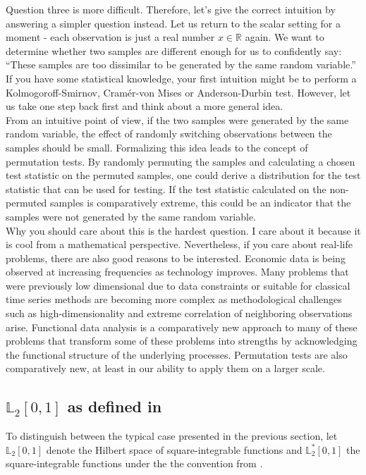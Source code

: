\documentclass[12pt, a4paper]{article}
\theoremstyle{MAstyle} \newtheorem{assumption}{Assumption}[section]
\theoremstyle{MAstyle} \newtheorem{definition}{Definition}[section]
\theoremstyle{MAstyle} \newtheorem{theorem}{Theorem}[section]
\begin{document}
			Question three is more difficult. Therefore, let's give the correct intuition by answering a simpler question instead. Let us return to the scalar setting for a moment - each observation is just a real number $x \in \mathbb{R}$ again. We want to determine whether two samples are different enough for us to confidently say: ``These samples are too dissimilar to be generated by the same random variable.'' If you have some statistical knowledge, your first intuition might be to perform a Kolmogoroff-Smirnov, Cram\'{e}r-von Mises or Anderson-Durbin test. However, let us take one step back first and think about a more general idea.\\
			
			From an intuitive point of view, if the two samples were generated by the same random variable, the effect of randomly switching observations between the samples should be small. Formalizing this idea leads to the concept of permutation tests. By randomly permuting the samples and calculating a chosen test statistic on the permuted samples, one could derive a distribution for the test statistic that can be used for testing. If the test statistic calculated on the non-permuted samples is comparatively extreme, this could be an indicator that the samples were not generated by the same random variable.\\
			
			Why you should care about this is the hardest question. I care about it because it is cool from a mathematical perspective. Nevertheless, if you care about real-life problems, there are also good reasons to be interested. Economic data is being observed at increasing frequencies as technology improves. Many problems that were previously low dimensional due to data constraints or suitable for classical time series methods are becoming more complex as methodological challenges such as high-dimensionality and extreme correlation of neighboring observations arise. Functional data analysis is a comparatively new approach to many of these problems that transform some of these problems into strengths by acknowledging the functional structure of the underlying processes. Permutation tests are also comparatively new, at least in our ability to apply them on a larger scale.
			
		\subsection{$\mathbb{L}_2[0,1]$ as defined in \cite{bugni_permutation_2021}}\label{deviation}
		To distinguish between the typical case presented in the previous section, let $\mathbb{L}_2[0,1]$ denote the Hilbert space of square-integrable functions and $\mathbb{L}^{*}_2[0,1]$ the square-integrable functions under the the convention from \cite{bugni_permutation_2021}.\\
		
\end{document}
